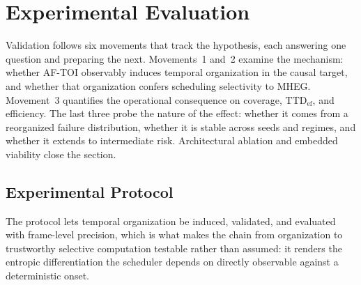 \documentclass[a4paper,fleqn]{cas-dc}
\newcommand{\AFTOI}{\mbox{AF-TOI}\xspace}
\newcommand{\MHEG}{\mbox{MHEG}\xspace}
\begin{document}
\section{Experimental Evaluation}
\label{sec:avaliacao}
Validation follows six movements that track the hypothesis, each answering one
question and preparing the next. Movements~1 and~2 examine the mechanism:
whether \AFTOI observably induces temporal organization in the causal target,
and whether that organization confers scheduling selectivity to \MHEG.
Movement~3 quantifies the operational consequence on coverage,
$\mathrm{TTD}_{\mathrm{ef}}$, and efficiency. The last three probe the nature of
the effect: whether it comes from a reorganized failure distribution, whether it
is stable across seeds and regimes, and whether it extends to intermediate risk.
Architectural ablation and embedded viability close the section.
\subsection{Experimental Protocol}
\label{sec:protocolo}
The protocol lets temporal organization be induced, validated, and evaluated with frame-level precision, which is what makes the chain from organization to trustworthy selective computation testable rather than assumed: it renders the entropic differentiation the scheduler depends on directly observable against a deterministic onset.
\end{document}
